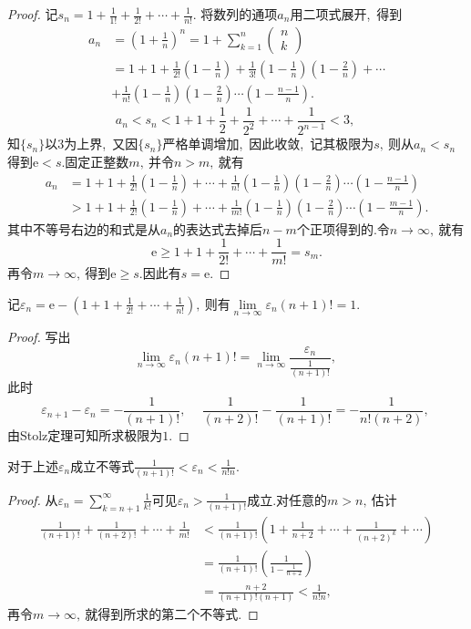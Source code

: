 \begin{proof}
	记$s_n=1+\frac{1}{1!}+\frac{1}{2!}+\cdots+\frac{1}{n!}.$
	将数列的通项$a_n$用二项式展开,\ 得到
	$$\begin{aligned}
		a_n&=(1+\frac{1}{n})^n=1+\sum\limits_{k=1}^{n}\begin{pmatrix}
			n\\
			k
		\end{pmatrix}\\
		&=1+1+\frac{1}{2!}(1-\frac{1}{n})+\frac{1}{3!}(1-\frac{1}{n})(1-\frac{2}{n})+\cdots\\
		&+\frac{1}{n!}(1-\frac{1}{n})(1-\frac{2}{n})\cdots(1-\frac{n-1}{n}).
	\end{aligned}$$
	$$a_n<s_n<1+1+\frac{1}{2}+\frac{1}{2^2}+\cdots+\frac{1}{2^{n-1}}<3,\ $$
	知$\{s_n\}$以$3$为上界,\ 又因$\{s_n\}$严格单调增加,\ 因此收敛,\ 记其极限为$s,\ $则从$a_n<s_n$得到$\mathrm{e}<s.$固定正整数$m,\ $并令$n>m,\ $就有
	$$\begin{aligned}
		a_n&=1+1+\frac{1}{2!}(1-\frac{1}{n})+\cdots+\frac{1}{n!}(1-\frac{1}{n})(1-\frac{2}{n})\cdots(1-\frac{n-1}{n})\\
		&>1+1+\frac{1}{2!}(1-\frac{1}{n})+\cdots+\frac{1}{m!}(1-\frac{1}{n})(1-\frac{2}{n})\cdots(1-\frac{m-1}{n}).
	\end{aligned}$$
	其中不等号右边的和式是从$a_n$的表达式去掉后$n-m$个正项得到的.令$n\rightarrow\infty,\ $就有
	$$\mathrm{e}\geqslant 1+1+\frac{1}{2!}+\cdots+\frac{1}{m!}=s_m.$$
	再令$m\rightarrow\infty,\ $得到$\mathrm{e}\geqslant s.$因此有$s=\mathrm{e}.$
\end{proof}
\begin{problem}
	记$\varepsilon_n=\mathrm{e}-\left(1+1+\frac{1}{2!}+\cdots+\frac{1}{n!}\right),\ $则有$\lim\limits_{n\rightarrow\infty}\varepsilon_n(n+1)!=1.$
\end{problem}
\begin{proof}
	写出
	$$\lim\limits_{n\rightarrow\infty}\varepsilon_n(n+1)!=\lim\limits_{n\rightarrow\infty}\frac{\varepsilon_n}{\frac{1}{(n+1)!}},\ $$
	此时
	$$\varepsilon_{n+1}-\varepsilon_n=-\frac{1}{(n+1)!},\ \quad\frac{1}{(n+2)!}-\frac{1}{(n+1)!}=-\frac{1}{n!(n+2)},\ $$
	由Stolz定理可知所求极限为$1.$
\end{proof}
\begin{problem}
	对于上述$\varepsilon_n$成立不等式$\frac{1}{(n+1)!}<\varepsilon_n<\frac{1}{n!n}.$
\end{problem}
\begin{proof}
	从$\varepsilon_n=\sum\limits_{k=n+1}^{\infty}\frac{1}{k!}$可见$\varepsilon_n>\frac{1}{(n+1)!}$成立.对任意的$m>n,\ $估计
	$$\begin{aligned}
		\frac{1}{(n+1)!}+\frac{1}{(n+2)!}+\cdots+\frac{1}{m!}&<\frac{1}{(n+1)!}\left(1+\frac{1}{n+2}+\cdots+\frac{1}{(n+2)^k}+\cdots\right)\\
		&=\frac{1}{(n+1)!}\left(\frac{1}{1-\frac{1}{n+2}}\right)\\
		&=\frac{n+2}{(n+1)!(n+1)}<\frac{1}{n!n},\ 
	\end{aligned}$$
	再令$m\rightarrow\infty,\ $就得到所求的第二个不等式.
\end{proof}
